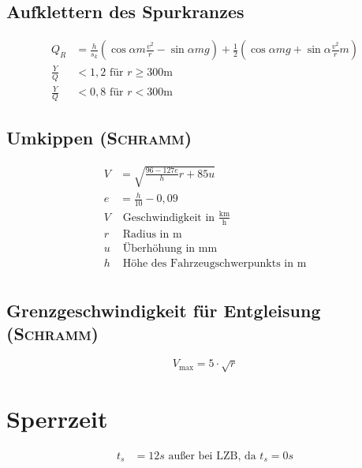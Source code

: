 \documentclass{scrartcl}
\begin{document}
	\subsection{Aufklettern des Spurkranzes}
	\begin{align*}
		Q_R &= \frac{h}{s_k} (\cos\alpha{}m\frac{v^2}{r}-\sin\alpha{}mg) + \frac{1}{2}(\cos\alpha{}mg + \sin\alpha{}\frac{v^2}{r}m) \\
		\frac{Y}{Q} &< 1,2 \text{ für } r\geq300\mathrm{m} \\
		\frac{Y}{Q} &< 0,8 \text{ für } r<300\mathrm{m}
	\end{align*}

	\subsection{Umkippen (\textsc{Schramm})}
	\begin{align*}
		V &= \sqrt{\frac{96-127e}{h}r+85u} \\
		e &= \frac{h}{10}-0,09 \\
		V & \text{ Geschwindigkeit in }\frac{\mathrm{km}}{\mathrm{h}} \\
		r & \text{ Radius in } \mathrm{m} \\
		u & \text{ Überhöhung in } \mathrm{mm} \\
		h & \text{ Höhe des Fahrzeugschwerpunkts in } \mathrm{m}\\
	\end{align*}

	\subsection{Grenzgeschwindigkeit für Entgleisung (\textsc{Schramm})}
	$$ V_\mathrm{max} = 5\cdot\sqrt{r} $$

	\section{Sperrzeit}
	\begin{align*}
		t_s &= 12s \text{ außer bei LZB, da } t_s = 0s \\
	\end{align*}
\end{document}
